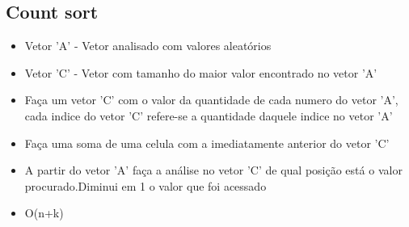 \documentclass{article}
\begin{document}
	\subsection{Count sort}
		\begin{itemize}
		\item Vetor 'A' - Vetor analisado com valores aleatórios
		\item Vetor 'C' - Vetor com tamanho do maior valor encontrado no vetor 'A'
		\item Faça um vetor 'C' com o valor da quantidade de cada numero do vetor 'A', cada indice do vetor 'C' refere-se a quantidade daquele indice no vetor 'A'
		\item Faça uma soma de uma celula com a imediatamente anterior do vetor 'C'
		\item A partir do vetor 'A' faça a análise no vetor 'C' de qual posição está o valor procurado.Diminui em 1 o valor que foi acessado
		\item O(n+k)
		\end{itemize}
	
\end{document}
